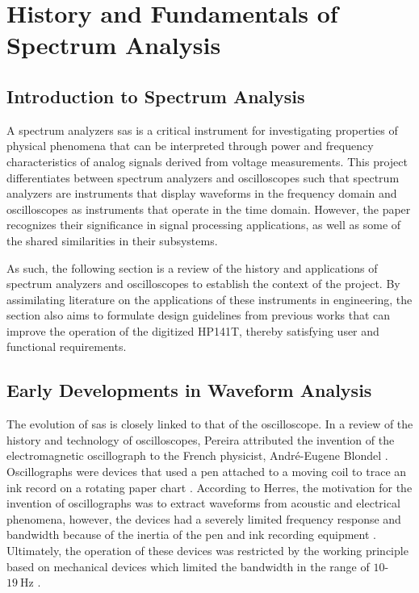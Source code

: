\documentclass[class=report,11pt,crop=false]{standalone}
\begin{document}
\section{History and Fundamentals of Spectrum Analysis}

\subsection{Introduction to Spectrum Analysis}

A spectrum analyzers \acrshort{sa}s is a critical instrument for investigating properties of physical phenomena that can be interpreted through power and frequency characteristics of analog signals derived from voltage measurements. This project differentiates between spectrum analyzers and oscilloscopes such that spectrum analyzers are instruments that display waveforms in the frequency domain and oscilloscopes as instruments that operate in the time domain. However, the paper recognizes their significance in signal processing applications, as well as some of the shared similarities in their subsystems. 

As such, the following section is a review of the history and applications of spectrum analyzers and oscilloscopes to establish the context of the project. By assimilating literature on the applications of these instruments in engineering, the section also aims to formulate design guidelines from previous works that can improve the operation of the digitized HP141T, thereby satisfying user and functional requirements. 

\subsection{Early Developments in Waveform Analysis}

The evolution of \acrshort{sa}s is closely linked to that of the oscilloscope. In a review of the history and technology of oscilloscopes, Pereira attributed the invention of the electromagnetic oscillograph to the French physicist, Andr\'{e}-Eugene Blondel \cite{pereira2006}. Oscillographs were devices that used a pen attached to a moving coil to trace an ink record on a rotating paper chart \cite{pereira2006}. According to Herres, the motivation for the invention of oscillographs was to extract waveforms from acoustic and electrical phenomena, however, the devices had a severely limited frequency response and bandwidth because of the inertia of the pen and ink recording equipment \cite{herres2020}. Ultimately, the operation of these devices was restricted by the working principle based on mechanical devices which limited the bandwidth in the range of $10$-$\SI{19}{\hertz}$ \cite{pereira2006}.
\end{document}
